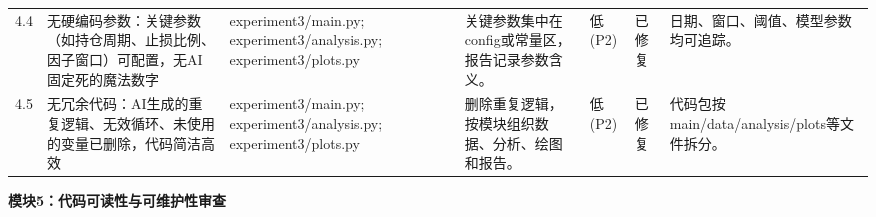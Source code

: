 \begin{longtable}{@{}L{0.045\textwidth}L{0.190\textwidth}L{0.140\textwidth}L{0.190\textwidth}L{0.060\textwidth}L{0.060\textwidth}L{0.205\textwidth}@{}}
4.4 & 无硬编码参数：关键参数（如持仓周期、止损比例、因子窗口）可配置，无AI固定死的魔法数字 & experiment3/\allowbreak{}main.py;\allowbreak{} experiment3/\allowbreak{}analysis.py;\allowbreak{} experiment3/\allowbreak{}plots.py & 关键参数集中在config或常量区，报告记录参数含义。 & 低(P2) & 已修复 & 日期、窗口、阈值、模型参数均可追踪。 \\
4.5 & 无冗余代码：AI生成的重复逻辑、无效循环、未使用的变量已删除，代码简洁高效 & experiment3/\allowbreak{}main.py;\allowbreak{} experiment3/\allowbreak{}analysis.py;\allowbreak{} experiment3/\allowbreak{}plots.py & 删除重复逻辑，按模块组织数据、分析、绘图和报告。 & 低(P2) & 已修复 & 代码包按main/\allowbreak{}data/\allowbreak{}analysis/\allowbreak{}plots等文件拆分。 \\
\end{longtable}
\endgroup

\textbf{模块5：代码可读性与可维护性审查}

